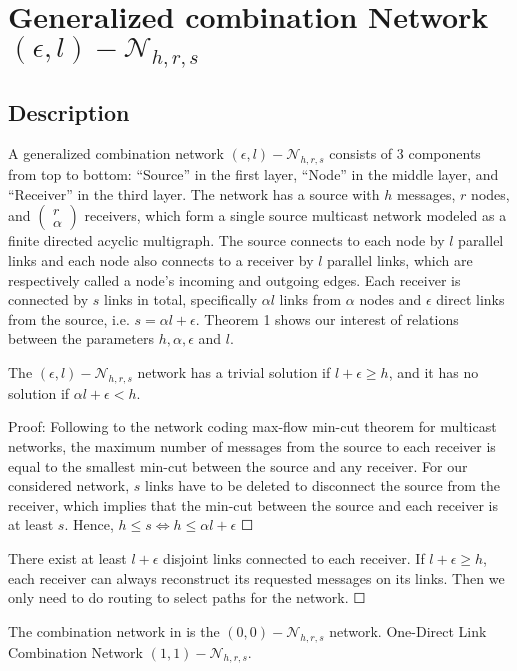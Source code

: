 \chapter{Generalized combination Network $(\epsilon,l)-\mathcal{N}_{h,r,s}$} \label{chap:general_network}

\section{Description}

A generalized combination network $(\epsilon,l)-\mathcal{N}_{h,r,s}$
consists of 3 components from top to bottom: ``Source'' in the first
layer, ``Node'' in the middle layer, and ``Receiver'' in the third
layer. The network has a source with $h$ messages, $r$ nodes, and
$\left(\begin{array}{c}
r\\
\alpha
\end{array}\right)$ receivers, which form a single source multicast network modeled as
a finite directed acyclic multigraph. The source connects to each
node by $l$ parallel links and each node also connects to a receiver
by $l$ parallel links, which are respectively called a node's incoming
and outgoing edges. Each receiver is connected by $s$ links in total,
specifically $\alpha l$ links from $\alpha$ nodes and $\epsilon$
direct links from the source, i.e. $s=\alpha l+\epsilon$. Theorem
1 shows our interest of relations between the parameters $h,\alpha,\epsilon$
and $l$.
\begin{thm}
\label{nw_parameters}The $(\epsilon,l)-\mathcal{N}_{h,r,s}$ network
has a trivial solution if $l+\epsilon\geq h$, and it has no solution
if $\alpha l+\epsilon<h$.

Proof: Following to the network coding max-flow min-cut theorem for
multicast networks, the maximum number of messages from the source
to each receiver is equal to the smallest min-cut between the source
and any receiver. For our considered network, $s$ links have to be
deleted to disconnect the source from the receiver, which implies
that the min-cut between the source and each receiver is at least
$s$. Hence, $h\leq s\Leftrightarrow h\leq\alpha l+\epsilon$ $\Square$

There exist at least $l+\epsilon$ disjoint links connected to each
receiver. If $l+\epsilon\geq h$, each receiver can always reconstruct
its requested messages on its links. Then we only need to do routing
to select paths for the network. $\Square$
\end{thm}
The combination network in \cite{Riis:2006} is the $(0,0)-\mathcal{N}_{h,r,s}$
network. One-Direct Link Combination Network $(1,1)-\mathcal{N}_{h,r,s}$.


